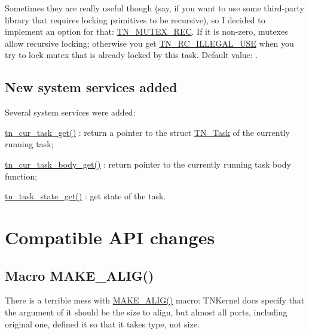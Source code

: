 Sometimes they are really useful though (say, if you want to use some third-\/party library that requires locking primitives to be recursive), so I decided to implement an option for that\+: {\ttfamily \hyperlink{tn__cfg__default_8h_a2557da78508c4241aceee92475df3581}{T\+N\+\_\+\+M\+U\+T\+E\+X\+\_\+\+R\+E\+C}}. If it is non-\/zero, mutexes allow recursive locking; otherwise you get {\ttfamily \hyperlink{tn__common_8h_aa43bd3da1ad4c1e61224b5f23b369876a2c83a60bf543df45b5045d6f7fbc7d0c}{T\+N\+\_\+\+R\+C\+\_\+\+I\+L\+L\+E\+G\+A\+L\+\_\+\+U\+S\+E}} when you try to lock mutex that is already locked by this task. Default value\+: {}.\hypertarget{tnkernel_diff_tnkernel_diff_new_functions}{}\subsection{New system services added}\label{tnkernel_diff_tnkernel_diff_new_functions}
Several system services were added\+:


\begin{DoxyItemize}
\item {\ttfamily \hyperlink{tn__sys_8h_a2ca353dcf362a5aa8d2e5a3960e51410}{tn\+\_\+cur\+\_\+task\+\_\+get()}} \+: return a pointer to the {\ttfamily struct \hyperlink{structTN__Task}{T\+N\+\_\+\+Task}} of the currently running task;
\item {\ttfamily \hyperlink{tn__sys_8h_afa3c83dce52b17c9ee07b34af0fcebab}{tn\+\_\+cur\+\_\+task\+\_\+body\+\_\+get()}} \+: return pointer to the currently running task body function;
\item {\ttfamily \hyperlink{tn__tasks_8h_a18408d825c0dab03511f3aaeeb3ffbb3}{tn\+\_\+task\+\_\+state\+\_\+get()}} \+: get state of the task.
\end{DoxyItemize}\hypertarget{tnkernel_diff_tnkernel_new_api}{}\section{Compatible A\+P\+I changes}\label{tnkernel_diff_tnkernel_new_api}
\hypertarget{tnkernel_diff_tnkernel_diff_make_alig}{}\subsection{Macro M\+A\+K\+E\+\_\+\+A\+L\+I\+G()}\label{tnkernel_diff_tnkernel_diff_make_alig}
There is a terrible mess with {\ttfamily \hyperlink{tn__oldsymbols_8h_aa42d2e6b5b7ff37bd485803fa2cb70a8}{M\+A\+K\+E\+\_\+\+A\+L\+I\+G()}} macro\+: T\+N\+Kernel docs specify that the argument of it should be the size to align, but almost all ports, including original one, defined it so that it takes type, not size.

